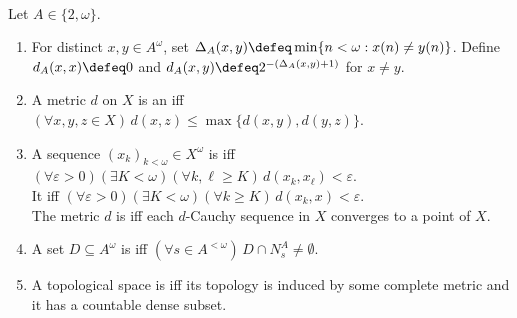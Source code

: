 \begin{definition} \label{def:baire-cantor-prefix-metric-and-polish-space} \\
Let $A\in\{2,\omega\}$.
\begin{enumerate}[label=(\roman*)]
\setlength{\itemsep}{0pt}
\item For distinct $x,y\in A^\omega$, set $\Delta_A(x,y)\defeq\min\{n<\omega:x(n)\neq y(n)\}$. Define $d_A(x,x)\defeq0$ and $d_A(x,y)\defeq2^{-(\Delta_A(x,y)+1)}$ for $x\neq y$.
\item A metric $d$ on $X$ is an  iff $(\forall x,y,z\in X)\,d(x,z)\leq\max\{d(x,y),d(y,z)\}$.
\item A sequence $(x_k)_{k<\omega}\in X^\omega$ is  iff $(\forall\varepsilon>0)(\exists K<\omega)(\forall k,\ell\geq K)\,d(x_k,x_\ell)<\varepsilon$.\\
It  iff $(\forall\varepsilon>0)(\exists K<\omega)(\forall k\geq K)\,d(x_k,x)<\varepsilon$.\\
The metric $d$ is  iff each $d$-Cauchy sequence in $X$ converges to a point of $X$.
\item A set $D\subseteq A^\omega$ is  iff $(\forall s\in A^{<\omega})\,D\cap N_s^A\neq\emptyset$.
\item A topological space is  iff its topology is induced by some complete metric and it has a countable dense subset.
\end{enumerate}
\end{definition}

